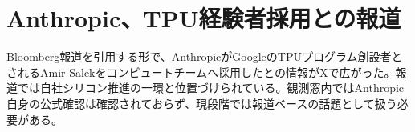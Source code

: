 \section{Anthropic、TPU経験者採用との報道}
Bloomberg報道を引用する形で、AnthropicがGoogleのTPUプログラム創設者とされるAmir Salekをコンピュートチームへ採用したとの情報がXで広がった。報道では自社シリコン推進の一環と位置づけられている。観測窓内ではAnthropic自身の公式確認は確認されておらず、現段階では報道ベースの話題として扱う必要がある。
